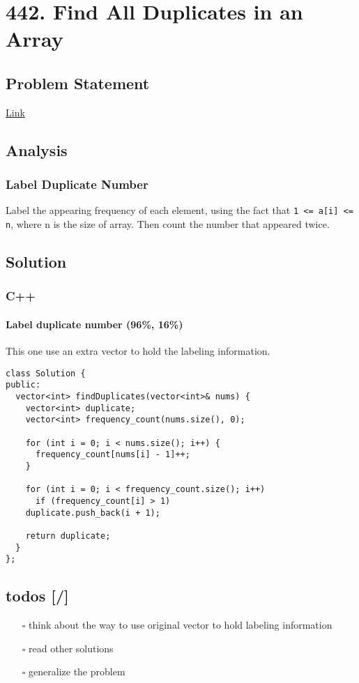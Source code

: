\documentclass[12pt]{article}
\begin{document}
\section{442. Find All Duplicates in an Array\label{orgc536669}}
\label{sec:org298c224}
\subsection{Problem Statement}
\label{sec:org8f8dd3e}
\href{https://leetcode.com/problems/find-all-duplicates-in-an-array/}{Link}
\subsection{Analysis}
\label{sec:orgf85238f}
\subsubsection{Label Duplicate Number}
\label{sec:orge14bbe7}
Label the appearing frequency of each element, using the fact that \texttt{1 <= a[i] <= n}, where n is the size of array. Then count the number that appeared twice.
\subsection{Solution}
\label{sec:orgfd69cfa}
\subsubsection{C++}
\label{sec:orgdff6027}
\paragraph{Label duplicate number (96\%, 16\%)}
\label{sec:orgcf5e4e6}
This one use an extra vector to hold the labeling information.
\begin{verbatim}
class Solution {
public:
  vector<int> findDuplicates(vector<int>& nums) {
    vector<int> duplicate;
    vector<int> frequency_count(nums.size(), 0);

    for (int i = 0; i < nums.size(); i++) {
      frequency_count[nums[i] - 1]++;
    }

    for (int i = 0; i < frequency_count.size(); i++)
      if (frequency_count[i] > 1)
	duplicate.push_back(i + 1);

    return duplicate;
  }
};
\end{verbatim}

\subsection{todos [/]}
\label{sec:org08e3b18}
\begin{itemize}
\item[{$\square$}] think about the way to use original vector to hold labeling information
\item[{$\square$}] read other solutions
\item[{$\square$}] generalize the problem
\end{itemize}
\end{document}
